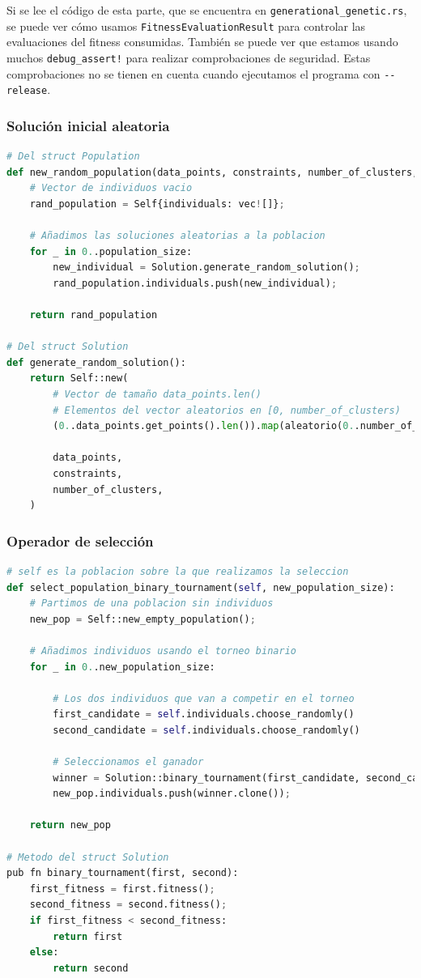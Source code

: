 \documentclass[11pt]{article}
\begin{document}
Si se lee el código de esta parte, que se encuentra en \lstinline{generational_genetic.rs}, se puede ver cómo usamos \lstinline{FitnessEvaluationResult} para controlar las evaluaciones del fitness consumidas. También se puede ver que estamos usando muchos \lstinline{debug_assert!} para realizar comprobaciones de seguridad. Estas comprobaciones no se tienen en cuenta cuando ejecutamos el programa con \lstinline{--release}.

\subsubsection{Solución inicial aleatoria}

\begin{lstlisting}[language=Python, style=Boxed]
# Del struct Population
def new_random_population(data_points, constraints, number_of_clusters, population_size):
    # Vector de individuos vacio
    rand_population = Self{individuals: vec![]};

    # Añadimos las soluciones aleatorias a la poblacion
    for _ in 0..population_size:
        new_individual = Solution.generate_random_solution();
        rand_population.individuals.push(new_individual);

    return rand_population

# Del struct Solution
def generate_random_solution():
    return Self::new(
        # Vector de tamaño data_points.len()
        # Elementos del vector aleatorios en [0, number_of_clusters)
        (0..data_points.get_points().len()).map(aleatorio(0..number_of_clusters),

        data_points,
        constraints,
        number_of_clusters,
    )
\end{lstlisting}

\subsubsection{Operador de selección}

\begin{lstlisting}[language=Python, style=Boxed]
# self es la poblacion sobre la que realizamos la seleccion
def select_population_binary_tournament(self, new_population_size):
    # Partimos de una poblacion sin individuos
    new_pop = Self::new_empty_population();

    # Añadimos individuos usando el torneo binario
    for _ in 0..new_population_size:

        # Los dos individuos que van a competir en el torneo
        first_candidate = self.individuals.choose_randomly()
        second_candidate = self.individuals.choose_randomly()

        # Seleccionamos el ganador
        winner = Solution::binary_tournament(first_candidate, second_candidate);
        new_pop.individuals.push(winner.clone());

    return new_pop

# Metodo del struct Solution
pub fn binary_tournament(first, second):
    first_fitness = first.fitness();
    second_fitness = second.fitness();
    if first_fitness < second_fitness:
        return first
    else:
        return second
\end{lstlisting}
\end{document}
